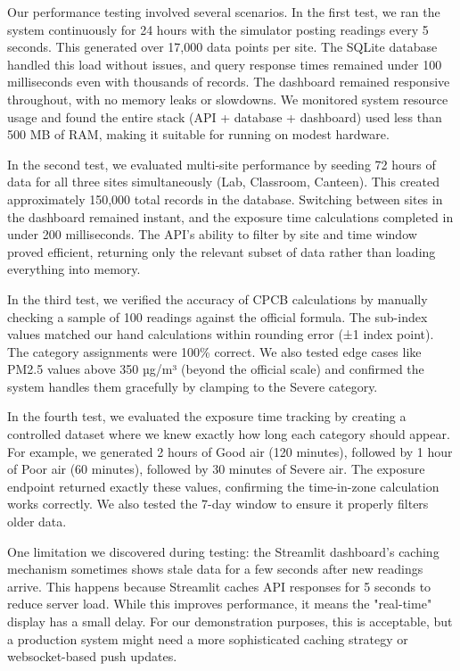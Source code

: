 \documentclass[12pt]{report}
\begin{document}
Our performance testing involved several scenarios. In the first test, we ran the system continuously for 24 hours with the simulator posting readings every 5 seconds. This generated over 17,000 data points per site. The SQLite database handled this load without issues, and query response times remained under 100 milliseconds even with thousands of records. The dashboard remained responsive throughout, with no memory leaks or slowdowns. We monitored system resource usage and found the entire stack (API + database + dashboard) used less than 500 MB of RAM, making it suitable for running on modest hardware.

In the second test, we evaluated multi-site performance by seeding 72 hours of data for all three sites simultaneously (Lab, Classroom, Canteen). This created approximately 150,000 total records in the database. Switching between sites in the dashboard remained instant, and the exposure time calculations completed in under 200 milliseconds. The API's ability to filter by site and time window proved efficient, returning only the relevant subset of data rather than loading everything into memory.

In the third test, we verified the accuracy of CPCB calculations by manually checking a sample of 100 readings against the official formula. The sub-index values matched our hand calculations within rounding error (±1 index point). The category assignments were 100\% correct. We also tested edge cases like PM2.5 values above 350 µg/m³ (beyond the official scale) and confirmed the system handles them gracefully by clamping to the Severe category.

In the fourth test, we evaluated the exposure time tracking by creating a controlled dataset where we knew exactly how long each category should appear. For example, we generated 2 hours of Good air (120 minutes), followed by 1 hour of Poor air (60 minutes), followed by 30 minutes of Severe air. The exposure endpoint returned exactly these values, confirming the time-in-zone calculation works correctly. We also tested the 7-day window to ensure it properly filters older data.

One limitation we discovered during testing: the Streamlit dashboard's caching mechanism sometimes shows stale data for a few seconds after new readings arrive. This happens because Streamlit caches API responses for 5 seconds to reduce server load. While this improves performance, it means the "real-time" display has a small delay. For our demonstration purposes, this is acceptable, but a production system might need a more sophisticated caching strategy or websocket-based push updates.
\end{document}
